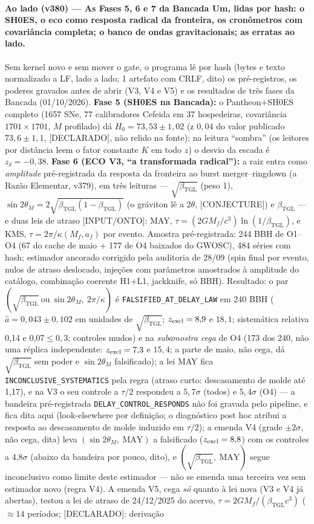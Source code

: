 \documentclass[11pt]{article}
\newcommand{\bTGL}{\beta_{\mathrm{TGL}}}\newcommand{\Msun}{M_{\odot}}\newcommand{\TGL}{\mathrm{TGL}}
\theoremstyle{definition}\newtheorem{deriv}{Derivação}
\begin{document}
\paragraph*{Ao lado (v380) --- As Fases 5, 6 e 7 da Bancada Um, lidas por hash: o SH0ES, o eco como resposta radical da fronteira, os cronômetros com covariância completa; o banco de ondas gravitacionais; as erratas ao lado.} Sem kernel novo e sem mover o gate, o programa lê por hash (bytes e texto normalizado a LF, lado a lado; 1 artefato com CRLF, dito) os pré-registros, os poderes gravados antes de abrir (V3, V4 e V5) e os resultados de três fases da Bancada (01/10/2026). \textbf{Fase 5 (SH0ES na Bancada):} o Pantheon+SH0ES completo (1657 SNe, 77 calibradores Cefeida em 37 hospedeiras, covariância $1701\times1701$, $M$ profilado) dá $H_0=73{,}53\pm1{,}02$ (z $0{,}04$ do valor publicado $73{,}6\pm1{,}1$, \textsf{[DECLARADO]}, não relido na fonte); na leitura ``sombra'' (os leitores por distância leem o fator constante $K$ em todo $z$) o desvio da escada é $z_\delta=-0{,}38$. \textbf{Fase 6 (ECO V3, ``a transformada radical''):} a raiz entra como \emph{amplitude} pré-registrada da resposta da fronteira ao burst merger--ringdown (a Razão Elementar, v379), em três leituras --- $\sqrt{\bTGL}$ (peso 1), $\sin 2\theta_M=2\sqrt{\bTGL(1-\bTGL)}$ (o gráviton lê a $2\theta$, \textsf{[CONJECTURE]}) e $\bTGL$ --- e duas leis de atraso \textsf{[INPUT/ONTO]}: MAY, $\tau=(2GM_f/c^3)\ln(1/\bTGL)$, e KMS, $\tau=2\pi/\kappa(M_f,a_f)$ por evento. Amostra pré-registrada: 244 BBH de O1--O4 (67 do cache de maio + 177 de O4 baixados do GWOSC), 484 séries com hash; estimador ancorado corrigido pela auditoria de 28/09 (spin final por evento, nulos de atraso deslocado, injeções com parâmetros amostrados à amplitude do catálogo, combinação coerente H1+L1, jackknife, só BBH). Resultado: o par $(\sqrt{\bTGL}\ \text{ou}\ \sin 2\theta_M,\ 2\pi/\kappa)$ é \texttt{FALSIFIED\_AT\_DELAY\_LAW} em 240 BBH ($\hat a=0{,}043\pm0{,}102$ em unidades de $\sqrt{\bTGL}$; $z_{\rm excl}=8{,}9$ e $18{,}1$; sistemática relativa 0{,}14 e 0{,}07$\le0{,}3$; controles mudos) e na \emph{subamostra cega} de O4 (173 dos 240, não uma réplica independente: $z_{\rm excl}=7{,}3$ e $15{,}4$; a parte de maio, não cega, dá $\sqrt{\bTGL}$ sem poder e $\sin 2\theta_M$ falsificado); a lei MAY fica \texttt{INCONCLUSIVE\_SYSTEMATICS} pela regra (atraso curto: descasamento de molde até 1{,}17), e na V3 o seu controle a $\tau/2$ respondeu a $5{,}7\sigma$ (todos) e $5{,}4\sigma$ (O4) --- a bandeira pré-registrada \texttt{DELAY\_CONTROL\_RESPONDS} não foi gravada pelo pipeline, e fica dita aqui (look-elsewhere por definição; o diagnóstico post hoc atribui a resposta ao descasamento de molde induzido em $\tau/2$); a emenda V4 (grade $\pm2\sigma$, não cega, dita) leva $(\sin 2\theta_M,\ \text{MAY})$ a falsificado ($z_{\rm excl}=8{,}8$) com os controles a 4{,}8$\sigma$ (abaixo da bandeira por pouco, dito), e $(\sqrt{\bTGL},\ \text{MAY})$ segue inconclusivo como limite deste estimador --- não se emenda uma terceira vez sem estimador novo (regra V4). A emenda V5, cega \emph{só} quanto à lei nova (V3 e V4 já abertas), testou a lei de atraso de 24/12/2025 do acervo, $\tau=2GM_f/(\bTGL c^3)$ ($\approx14$ períodos; \textsf{[DECLARADO]}: derivação 
\end{document}

